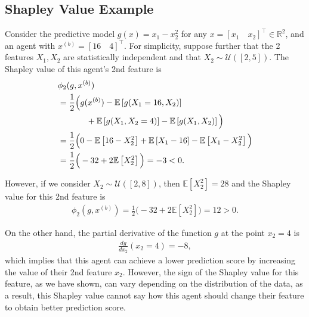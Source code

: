 \subsection{Shapley Value Example}\label{apx:shapley}

\begin{example}\label{example:shapley}
Consider the predictive model $g(x)=x_1-x_2^2$ for any $x=[x_1\quad x_2]^\top\in\mathbb{R}^2$, and an agent with $x^{(b)}=[16\quad 4]^\top$. For simplicity, suppose further that the 2 features $X_1, X_2$ are statistically independent and that $X_2\sim\mathcal{U}([2,5])$. The Shapley value of this agent's 2nd feature is
\begin{align*}
&\phi_2(g, x^{(b)}) 
\\
&= \frac{1}{2}\Big(g(x^{(b)}) - \mathbb{E}\left[g(X_1=16, X_2)\right]
\\
&\hspace{12mm} +\mathbb{E}\left[g(X_1, X_2=4)\right] - \mathbb{E}\left[g(X_1, X_2)\right]\Big)
\\
&= \frac{1}{2}\Big(0 - \mathbb{E}\left[16-X_2^2\right] + \mathbb{E}\left[X_1-16\right] - \mathbb{E}\left[X_1-X_2^2\right]\Big) 
\\
&= \frac{1}{2}\Big(-32+2\mathbb{E}\left[X_2^2\right]\Big) = -3 < 0
.
\end{align*}

However, if we consider $X_2\sim\mathcal{U}([2,8])$, then $\mathbb{E}\left[X_2^2\right]=28$ and the Shapley value for this 2nd feature is
\begin{align*}
\phi_2(g, x^{(b)}) = \frac{1}{2}\Big(-32+ 2\mathbb{E}\left[X_2^2\right]\Big)=12>0
.
\end{align*}

On the other hand, the partial derivative of the function $g$ at the point $x_2=4$ is
\begin{align*}
\frac{dg}{dx_2}(x_2=4) = -8,
\end{align*}
which implies that this agent can achieve a lower prediction score by increasing the value of their 2nd feature $x_2$. However, the sign of the Shapley value for this feature, as we have shown, can vary depending on the distribution of the data, as a result, this Shapley value cannot say how this agent should change their feature to obtain better prediction score.

\end{example}


